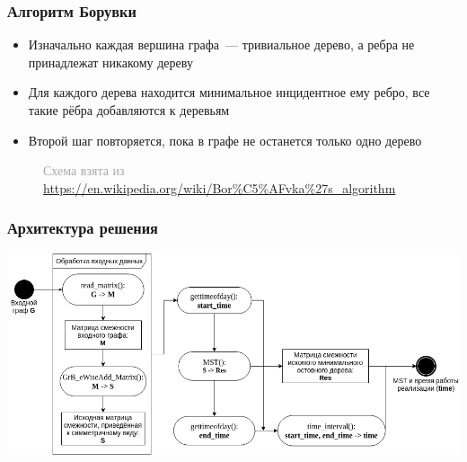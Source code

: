 \documentclass{beamer}
\begin{document}
\begin{frame}
  \transwipe[direction=90]
  \frametitle{Алгоритм Борувки}
  \begin{itemize}
	\item Изначально каждая вершина графа~--- тривиальное дерево, а ребра не принадлежат никакому дереву
	\item Для каждого дерева находится минимальное инцидентное ему ребро, все такие рёбра добавляются к деревьям
	\item Второй шаг повторяется, пока в графе не останется только одно дерево
  \end{itemize}
  \begin{figure}[h]
      \begin{flushright}
          \textcolor{darkgray}{\tiny Схема взята из \url{https://en.wikipedia.org/wiki/Bor\%C5\%AFvka\%27s\_algorithm}}
      \end{flushright}
  \end{figure}
\end{frame}


\begin{frame}
  \transwipe[direction=90]
  \frametitle{Архитектура решения}
	\includegraphics[width=\textwidth]{pictures/Diagram}
\end{frame}
\end{document}
